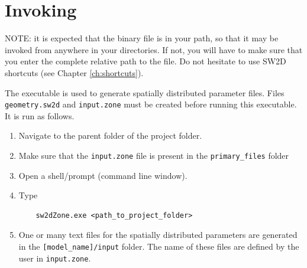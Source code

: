 \section{Invoking \swZone}
NOTE: it is expected that the binary file \swZone is in your path, so that it may be invoked from anywhere in your directories. If not, you will have to make sure that you enter the complete relative path to the \swZone file. Do not hesitate to use SW2D shortcuts (see Chapter \ref{ch:shortcuts}).

The \swZone executable is used to generate spatially distributed parameter files. Files \texttt{geometry.sw2d} and \texttt{input.zone} must be created before running this executable. It is run as follows.

\begin{enumerate}
	\item Navigate to the parent folder of the \swdd project folder.
	\item Make sure that the \texttt{input.zone} file is present in the \texttt{primary\_files} folder
	\item Open a shell/prompt (command line window).
	\item Type
	\begin{verbatim}
	sw2dZone.exe <path_to_project_folder>
	\end{verbatim}
	\item One or many text files for the spatially distributed parameters are generated in the \texttt{[model\_name]/input} folder. The name of these files are defined by the user in \texttt{input.zone}.
	\end{enumerate}
